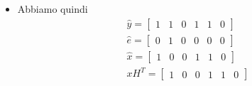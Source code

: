 \begin{enumerate}
{\begin{itemize}
{                            \begin{align}
                                    \hat{x} &= y + \hat{e} =  (y + \hat{e})H^T=y H^T+ \hat{e}H^T= s+s =0 \nonumber \\
                                    &\begin{bmatrix}
                                        0 & 1 & 0 & 0 & 0 & 0
                                        \end{bmatrix}
                                        \begin{bmatrix}
                                        1 & 1 & 0 \\ 
                                        0 & 1 & 1 \\ 
                                        1 & 0 & 1 \\ 
                                        1 & 0 & 0 \\
                                        0 & 1 & 0 \\
                                        0 & 0 & 1 
                                        \end{bmatrix} = 0  \nonumber
                            \end{align}  
                        }
                        \item {Abbiamo quindi 
                        \begin{gather}
                            \hat{y} =\begin{bmatrix}
                                1 & 1 & 0 & 1 & 1 & 0
                                \end{bmatrix} \nonumber \\
                            \hat{e} = \begin{bmatrix}
                                0 & 1 & 0 & 0 & 0 & 0
                                \end{bmatrix}\nonumber \\
                            \hat{x} = \begin{bmatrix}
                                1 & 0 & 0 & 1 & 1 & 0
                                \end{bmatrix}\nonumber \\
                            xH^T=
                                \begin{bmatrix}
                                1 & 0 & 0 & 1 & 1 & 0
                                \end{bmatrix}

\end{gather}}
\end{itemize}}
\end{enumerate}
